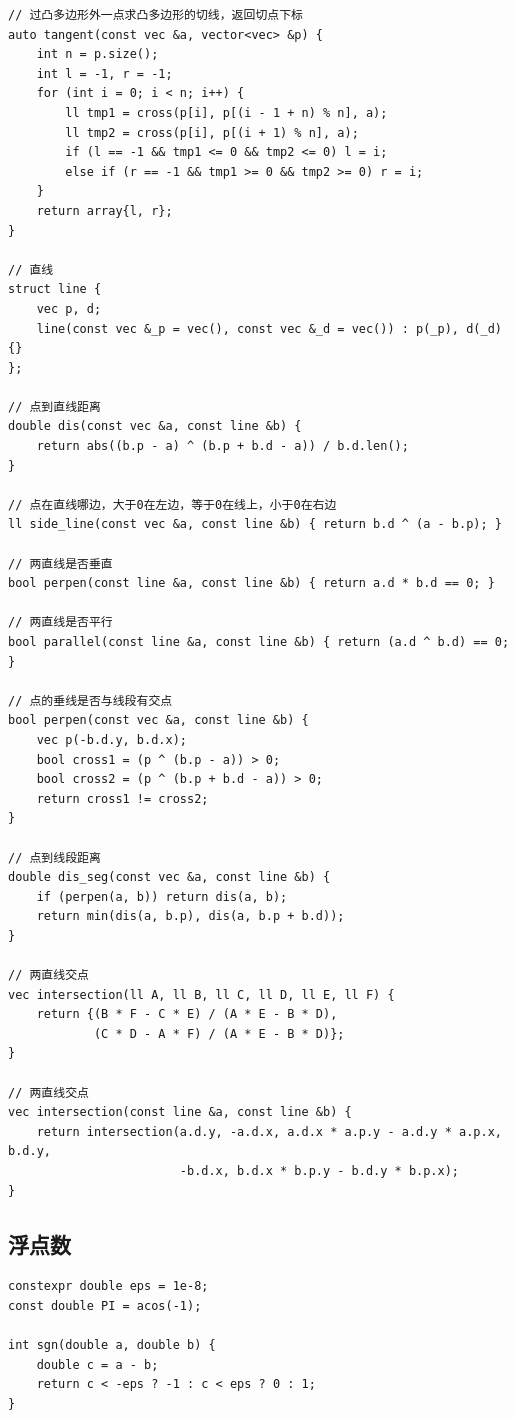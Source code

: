 \documentclass[UTF8]{ctexart}
\begin{document}
\begin{sloppypar}
\begin{lstlisting}[style=cpp]
// 过凸多边形外一点求凸多边形的切线，返回切点下标
auto tangent(const vec &a, vector<vec> &p) {
    int n = p.size();
    int l = -1, r = -1;
    for (int i = 0; i < n; i++) {
        ll tmp1 = cross(p[i], p[(i - 1 + n) % n], a);
        ll tmp2 = cross(p[i], p[(i + 1) % n], a);
        if (l == -1 && tmp1 <= 0 && tmp2 <= 0) l = i;
        else if (r == -1 && tmp1 >= 0 && tmp2 >= 0) r = i;
    }
    return array{l, r};
}

// 直线
struct line {
    vec p, d;
    line(const vec &_p = vec(), const vec &_d = vec()) : p(_p), d(_d) {}
};

// 点到直线距离
double dis(const vec &a, const line &b) {
    return abs((b.p - a) ^ (b.p + b.d - a)) / b.d.len();
}

// 点在直线哪边，大于0在左边，等于0在线上，小于0在右边
ll side_line(const vec &a, const line &b) { return b.d ^ (a - b.p); }

// 两直线是否垂直
bool perpen(const line &a, const line &b) { return a.d * b.d == 0; }

// 两直线是否平行
bool parallel(const line &a, const line &b) { return (a.d ^ b.d) == 0; }

// 点的垂线是否与线段有交点
bool perpen(const vec &a, const line &b) {
    vec p(-b.d.y, b.d.x);
    bool cross1 = (p ^ (b.p - a)) > 0;
    bool cross2 = (p ^ (b.p + b.d - a)) > 0;
    return cross1 != cross2;
}

// 点到线段距离
double dis_seg(const vec &a, const line &b) {
    if (perpen(a, b)) return dis(a, b);
    return min(dis(a, b.p), dis(a, b.p + b.d));
}

// 两直线交点
vec intersection(ll A, ll B, ll C, ll D, ll E, ll F) {
    return {(B * F - C * E) / (A * E - B * D),
            (C * D - A * F) / (A * E - B * D)};
}

// 两直线交点
vec intersection(const line &a, const line &b) {
    return intersection(a.d.y, -a.d.x, a.d.x * a.p.y - a.d.y * a.p.x, b.d.y,
                        -b.d.x, b.d.x * b.p.y - b.d.y * b.p.x);
}
\end{lstlisting}

\subsection{浮点数}

\begin{lstlisting}[style=cpp]
constexpr double eps = 1e-8;
const double PI = acos(-1);

int sgn(double a, double b) {
    double c = a - b;
    return c < -eps ? -1 : c < eps ? 0 : 1;
}


\end{lstlisting}
\end{sloppypar}
\end{document}
